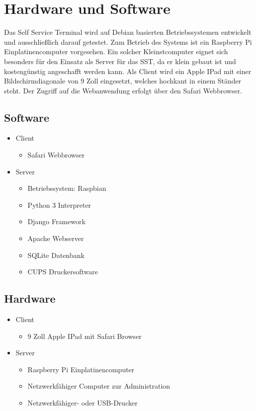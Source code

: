 \section{Hardware und Software}

Das Self Service Terminal wird auf Debian basierten Betriebssystemen entwickelt und ausschließlich darauf getestet. Zum Betrieb des Systems ist ein Raspberry Pi Einplatinencomputer vorgesehen. Ein solcher Kleinstcomputer eignet sich besonders für den Einsatz als Server für das SST, da er klein gebaut ist und kostengünstig angeschafft werden kann. Als Client wird ein Apple IPad mit einer Bildschirmdiagonale von 9 Zoll eingesetzt, welches hochkant in einem Ständer steht. Der Zugriff auf die Webanwendung erfolgt über den Safari Webbrowser.

\vspace{1,5cm}
\subsection{Software}

\begin{itemize}
  \item Client
    \begin{itemize}
      \item Safari Webbrowser
    \end{itemize}
  \item Server
    \begin{itemize}
      \item Betriebssystem: Raspbian
      \item Python 3 Interpreter
      \item Django Framework
      \item Apache Webserver
      \item SQLite Datenbank
      \item CUPS Druckersoftware
    \end{itemize}
\end{itemize}
\newpage

\subsection{Hardware}


 \begin{itemize}
    \item Client
    \begin{itemize}
      \item 9 Zoll Apple IPad mit Safari Browser
    \end{itemize}
  \item Server
    \begin{itemize}
      \item Raspberry Pi Einplatinencomputer
      \item Netzwerkfähiger Computer zur Administration
      \item Netzwerkfähiger- oder USB-Drucker
    \end{itemize}
\end{itemize}

